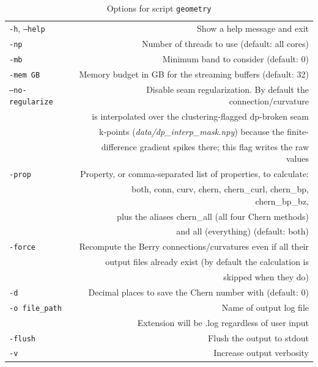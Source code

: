 \documentclass[a4paper,12pt]{report}
\begin{document}
\begin{table}[ht]
 \centering
 \caption{Options for script \texttt{geometry}}\label{tab:options_geometry}
\begin{tabular}[]{lr}
  \hline
  \texttt{-h}, \texttt{--help}  &\hspace*{2cm} Show a help message and exit \\
  \texttt{-np}                  & Number of threads to use (default: all cores) \\
  \texttt{-mb}                  & Minimum band to consider (default: 0) \\
  \texttt{-mem GB}              & Memory budget in GB for the streaming buffers (default: 32) \\
  \texttt{--no-regularize}      & Disable seam regularization. By default the connection/curvature\\
                                & is interpolated over the clustering-flagged dp-broken seam\\
                                & k-points (\emph{data/dp\_interp\_mask.npy}) because the finite-\\
                                & difference gradient spikes there; this flag writes the raw values\\
  \texttt{-prop}                & Property, or comma-separated list of properties, to calculate:\\
                                & both, conn, curv, chern, chern\_curl, chern\_bp, chern\_bp\_bz,\\
                                & plus the aliases chern\_all (all four Chern methods)\\
                                & and all (everything) (default: both)\\
  \texttt{-force}               & Recompute the Berry connections/curvatures even if all their\\
                                & output files already exist (by default the calculation is\\
                                & skipped when they do)\\
  \texttt{-d}                   & Decimal places to save the Chern number with (default: 0) \\
  \texttt{-o file\_path}        & Name of output log file\\
                                & Extension will be .log regardless of user input\\
  \texttt{-flush}               & Flush the output to stdout \\
  \texttt{-v}                   & Increase output verbosity \\
  \hline
\end{tabular}
\end{table}
\end{document}
